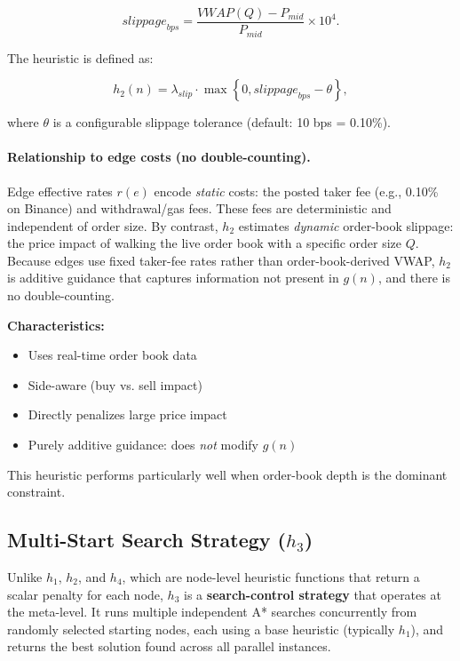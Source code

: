 \[
\textit{slippage}_{bps} =
\frac{\textit{VWAP}(Q) - P_{mid}}{P_{mid}} \times 10^{4}.
\]

The heuristic is defined as:

\[
h_2(n) =
\lambda_{slip} \cdot 
\max \left\{ 0, \textit{slippage}_{bps} - \theta \right\},
\]

where $\theta$ is a configurable slippage tolerance (default: 10 bps = 0.10\%).

\paragraph{Relationship to edge costs (no double-counting).}
Edge effective rates $r(e)$ encode \emph{static} costs: the posted taker fee (e.g., 0.10\% on Binance) and withdrawal/gas fees. These fees are deterministic and independent of order size. By contrast, $h_2$ estimates \emph{dynamic} order-book slippage: the price impact of walking the live order book with a specific order size $Q$. Because edges use fixed taker-fee rates rather than order-book-derived VWAP, $h_2$ is additive guidance that captures information not present in $g(n)$, and there is no double-counting.

\textbf{Characteristics:}
\begin{itemize}
    \item Uses real-time order book data
    \item Side-aware (buy vs. sell impact)
    \item Directly penalizes large price impact
    \item Purely additive guidance: does \emph{not} modify $g(n)$
\end{itemize}

This heuristic performs particularly well when order-book depth is the dominant constraint.

\subsection{Multi-Start Search Strategy ($h_3$)}
\label{sec:h3_multistart}

Unlike $h_1$, $h_2$, and $h_4$, which are node-level heuristic functions that return a scalar penalty for each node, $h_3$ is a \textbf{search-control strategy} that operates at the meta-level. It runs multiple independent A* searches concurrently from randomly selected starting nodes, each using a base heuristic (typically $h_1$), and returns the best solution found across all parallel instances.

